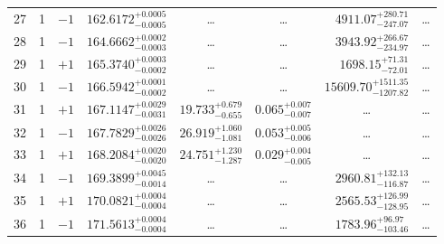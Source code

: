 \begin{table*}[!]
\begin{tabular}{llcrrlrc}
27 & 1 & $-1$ & $    162.6172_{-      0.0005}^{+      0.0005}$ & \multicolumn{1}{c}{\dots} & \multicolumn{1}{c}{\dots} & $     4911.07_{-      247.07}^{+      280.71}$ & \dots \\[1pt]
28 & 1 & $-1$ & $    164.6662_{-      0.0003}^{+      0.0002}$ & \multicolumn{1}{c}{\dots} & \multicolumn{1}{c}{\dots} & $     3943.92_{-      234.97}^{+      266.67}$ & \dots \\[1pt]
29 & 1 & $+1$ & $    165.3740_{-      0.0002}^{+      0.0003}$ & \multicolumn{1}{c}{\dots} & \multicolumn{1}{c}{\dots} & $     1698.15_{-       72.01}^{+       71.31}$ & \dots \\[1pt]
30 & 1 & $-1$ & $    166.5942_{-      0.0002}^{+      0.0001}$ & \multicolumn{1}{c}{\dots} & \multicolumn{1}{c}{\dots} & $    15609.70_{-     1207.82}^{+     1511.35}$ & \dots \\[1pt]
31 & 1 & $+1$ & $    167.1147_{-      0.0031}^{+      0.0029}$ & $      19.733_{-       0.655}^{+       0.679}$ & $       0.065_{-       0.007}^{+       0.007}$ & \multicolumn{1}{c}{\dots} & \dots \\[1pt]
32 & 1 & $-1$ & $    167.7829_{-      0.0026}^{+      0.0026}$ & $      26.919_{-       1.081}^{+       1.060}$ & $       0.053_{-       0.006}^{+       0.005}$ & \multicolumn{1}{c}{\dots} & \dots \\[1pt]
33 & 1 & $+1$ & $    168.2084_{-      0.0020}^{+      0.0020}$ & $      24.751_{-       1.287}^{+       1.230}$ & $       0.029_{-       0.005}^{+       0.004}$ & \multicolumn{1}{c}{\dots} & \dots \\[1pt] 
34 & 1 & $-1$ & $    169.3899_{-      0.0014}^{+      0.0045}$ & \multicolumn{1}{c}{\dots} & \multicolumn{1}{c}{\dots} & $     2960.81_{-      116.87}^{+      132.13}$ & \dots \\[1pt]
35 & 1 & $+1$ & $    170.0821_{-      0.0004}^{+      0.0004}$ & \multicolumn{1}{c}{\dots} & \multicolumn{1}{c}{\dots} & $     2565.53_{-      128.95}^{+      126.99}$ & \dots \\[1pt]
36 & 1 & $-1$ & $    171.5613_{-      0.0004}^{+      0.0004}$ & \multicolumn{1}{c}{\dots} & \multicolumn{1}{c}{\dots} & $     1783.96_{-      103.46}^{+       96.97}$ & \dots \\[1pt]


\end{tabular}
\end{table*}
